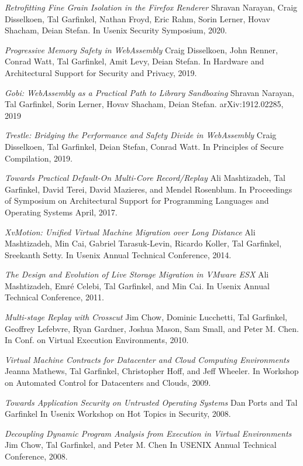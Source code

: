 \begin{resume}
{\em Retrofitting Fine Grain Isolation in the Firefox Renderer} Shravan
Narayan, Craig Disselkoen, Tal Garfinkel, Nathan Froyd, Eric Rahm, Sorin
Lerner, Hovav Shacham, Deian Stefan. In Usenix Security Symposium, 2020.

{\em Progressive Memory Safety in WebAssembly} Craig Disselkoen, John Renner,
Conrad Watt, Tal Garfinkel, Amit Levy, Deian Stefan. In Hardware and Architectural
Support for Security and Privacy, 2019.

{\em Gobi: WebAssembly as a Practical Path to Library Sandboxing} Shravan
Narayan, Tal Garfinkel, Sorin Lerner, Hovav Shacham, Deian Stefan.
arXiv:1912.02285, 2019


{\em Trestle: Bridging the Performance and Safety Divide in WebAssembly}
Craig Disselkoen, Tal Garfinkel, Deian Stefan, Conrad Watt. In Principles of
Secure Compilation, 2019.


{\em Towards Practical Default-On Multi-Core Record/Replay}
Ali Mashtizadeh, Tal Garfinkel, David Terei, David Mazieres, and Mendel
Rosenblum.  In Proceedings of Symposium on Architectural Support for Programming
Languages and Operating Systems April, 2017.


{\em XvMotion: Unified Virtual Machine Migration over Long Distance} Ali
Mashtizadeh, Min Cai, Gabriel Tarasuk-Levin, Ricardo Koller, Tal Garfinkel,
Sreekanth Setty. In Usenix Annual Technical Conference, 2014.

{\em The Design and Evolution of Live Storage Migration in VMware ESX} Ali
Mashtizadeh, Emré Celebi, Tal Garfinkel, and Min Cai. In Usenix Annual Technical
Conference, 2011.

{\em Multi-stage Replay with Crosscut} Jim Chow, Dominic Lucchetti, Tal Garfinkel, Geoffrey Lefebvre, Ryan Gardner, Joshua Mason, Sam Small, and Peter M. Chen. In Conf. on Virtual Execution Environments, 2010.


{\em Virtual Machine Contracts for Datacenter and Cloud Computing Environments } Jeanna Mathews, Tal Garfinkel, Christopher Hoff, and Jeff Wheeler. In Workshop on Automated Control for Datacenters and Clouds, 2009.

{\em Towards Application Security on Untrusted Operating Systems}  Dan
Ports and Tal Garfinkel\newline
In Usenix Workshop on Hot Topics in Security, 2008.


{\em Decoupling Dynamic Program Analysis from Execution in Virtual
Environments} Jim Chow, Tal Garfinkel, and Peter M. Chen
In USENIX Annual Technical Conference, 2008.



\end{resume}
